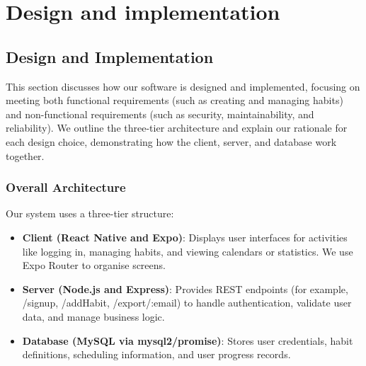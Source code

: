 \chapter{Design and implementation}
\label{chap:design-and-implementation}

\section{Design and Implementation}

This section discusses how our software is designed and implemented, focusing on meeting both functional requirements (such as creating and managing habits) and non-functional requirements (such as security, maintainability, and reliability). We outline the three-tier architecture and explain our rationale for each design choice, demonstrating how the client, server, and database work together.

\subsection{Overall Architecture}

Our system uses a three-tier structure: \begin{itemize} \item \textbf{Client (React Native and Expo)}:
Displays user interfaces for activities like logging in, managing habits, and viewing calendars or statistics. We use Expo Router to organise screens.
\item \textbf{Server (Node.js and Express)}:
Provides REST endpoints (for example, /signup, /addHabit, /export/:email) to handle authentication, validate user data, and manage business logic.
\item \textbf{Database (MySQL via mysql2/promise)}:
Stores user credentials, habit definitions, scheduling information, and user progress records. \end{itemize}


